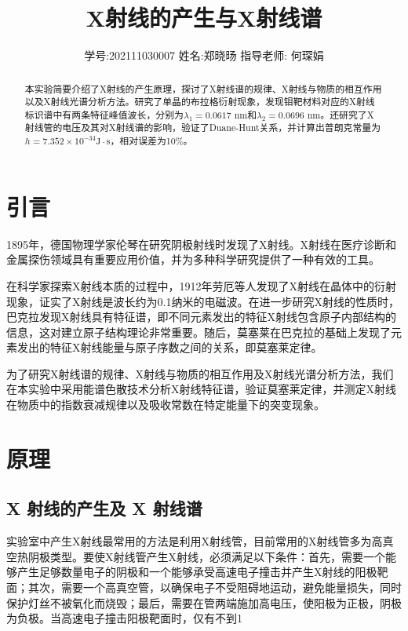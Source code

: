 \documentclass[11pt,a4paper]{article}
\title{\vspace{-4cm}\Large X射线的产生与X射线谱}  %
\author{\kaishu 学号:202111030007 \hspace{1.5cm} 姓名:郑晓旸 \hspace{1.5cm} 指导老师: 何琛娟}   %
\date{}
\begin{document}
\maketitle

\begin{abstract}
    本实验简要介绍了X射线的产生原理，探讨了X射线谱的规律、X射线与物质的相互作用以及X射线光谱分析方法。研究了单晶的布拉格衍射现象，发现钼靶材料对应的X射线标识谱中有两条特征峰值波长，分别为$\lambda_1=0.0617$ nm和$\lambda_2=0.0696$ nm。还研究了X射线管的电压及其对X射线谱的影响，验证了Duane-Hunt关系，并计算出普朗克常量为$h=7.352\times10^{-34}\text{J}\cdot\text{s}$，相对误差为10\%。
	
\end{abstract}

\section{引言}
1895年，德国物理学家伦琴在研究阴极射线时发现了X射线。X射线在医疗诊断和金属探伤领域具有重要应用价值，并为多种科学研究提供了一种有效的工具。

在科学家探索X射线本质的过程中，1912年劳厄等人发现了X射线在晶体中的衍射现象，证实了X射线是波长约为0.1纳米的电磁波。在进一步研究X射线的性质时，巴克拉发现X射线具有特征谱，即不同元素发出的特征X射线包含原子内部结构的信息，这对建立原子结构理论非常重要。随后，莫塞莱在巴克拉的基础上发现了元素发出的特征X射线能量与原子序数之间的关系，即莫塞莱定律。

为了研究X射线谱的规律、X射线与物质的相互作用及X射线光谱分析方法，我们在本实验中采用能谱色散技术分析X射线特征谱，验证莫塞莱定律，并测定X射线在物质中的指数衰减规律以及吸收常数在特定能量下的突变现象。

\section{原理}
\subsection{X 射线的产生及 X 射线谱}
实验室中产生X射线最常用的方法是利用X射线管，目前常用的X射线管多为高真空热阴极类型。要使X射线管产生X射线，必须满足以下条件：首先，需要一个能够产生足够数量电子的阴极和一个能够承受高速电子撞击并产生X射线的阳极靶面；其次，需要一个高真空管，以确保电子不受阻碍地运动，避免能量损失，同时保护灯丝不被氧化而烧毁；最后，需要在管两端施加高电压，使阳极为正极，阴极为负极。当高速电子撞击阳极靶面时，仅有不到1%
\end{document}
